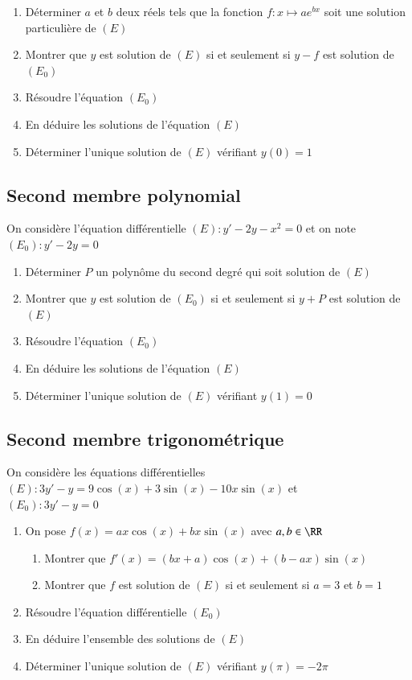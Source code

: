 \documentclass[oneside,12pt]{article}          %
\begin{document}
\begin{enumerate}
    \item Déterminer $a$ et $b$ deux réels tels que la fonction $f:x\mapsto ae^{bx}$ soit une solution particulière de $(E)$
    \item Montrer que $y$ est solution de $(E)$ si et seulement si $y-f$ est solution de $(E_0)$
    \item Résoudre l'équation $(E_0)$
    \item En déduire les solutions de l'équation $(E)$
    \item Déterminer l'unique solution de $(E)$ vérifiant $y(0)=1$
\end{enumerate}



\subsection{Second membre polynomial}
  On considère l'équation différentielle $(E):y'-2y-x^2=0$ et on note $(E_0):y'-2y=0$

\begin{enumerate}
    \item Déterminer $P$ un polynôme du second degré qui soit solution de $(E)$
    \item Montrer que $y$ est solution de $(E_0)$ si et seulement si $y+P$ est solution de $(E)$
    \item Résoudre l'équation $(E_0)$
    \item En déduire les solutions de l'équation $(E)$
    \item Déterminer l'unique solution de $(E)$ vérifiant $y(1)=0$
\end{enumerate}



\subsection{Second membre trigonométrique}
On considère les équations différentielles $(E):3y'-y=9\cos(x)+3\sin(x)-10x\sin(x)$ et\\
$(E_0):3y'-y=0$
\begin{enumerate}
    \item On pose $f(x)=ax\cos(x)+bx\sin(x)$ \quad avec $a,b\in\RR$
    \begin{enumerate}
        \item Montrer que $f'(x)=(bx+a)\cos(x)+(b-ax)\sin(x)$
        \item Montrer que $f$ est solution de $(E)$ si et seulement si $a=3$ et $b=1$
    \end{enumerate}
    \item Résoudre l'équation différentielle $(E_0)$
    \item En déduire l'ensemble des solutions de $(E)$
    \item Déterminer l'unique solution de $(E)$ vérifiant $y(\pi)=-2\pi$
\end{enumerate}
\end{document}
